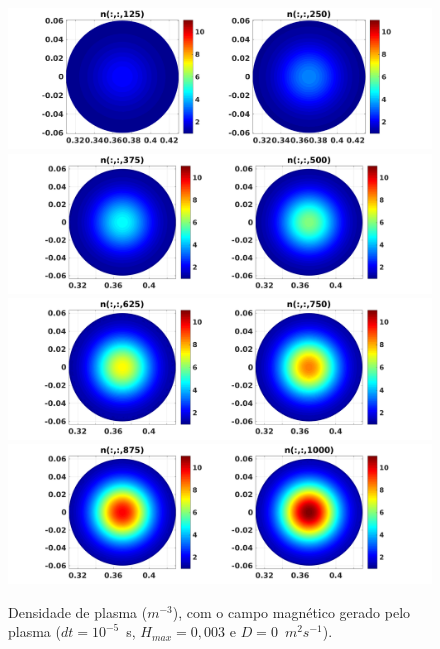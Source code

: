 \documentclass[12pt,oneside,a4paper]{abntex2}
\begin{document}
\begin{figure}[H]
\centering
\includegraphics[scale=0.5]{../SImulacao_breakdown/PDE/ntod1B3.png}  
\includegraphics[scale=0.5]{../SImulacao_breakdown/PDE/ntod2B3.png} 
\includegraphics[scale=0.5]{../SImulacao_breakdown/PDE/ntod3B3.png} 
\includegraphics[scale=0.5]{../SImulacao_breakdown/PDE/ntod4B3.png} 
\caption{Densidade de plasma ($m^{-3}$), com o campo magnético gerado pelo plasma ($dt=10^{-5}$\ s, $H_{max} = 0,003$ e $D=0$\ $m^2s^{-1}$).}
\label{campplasmasil1}
\end{figure}
\end{document}
